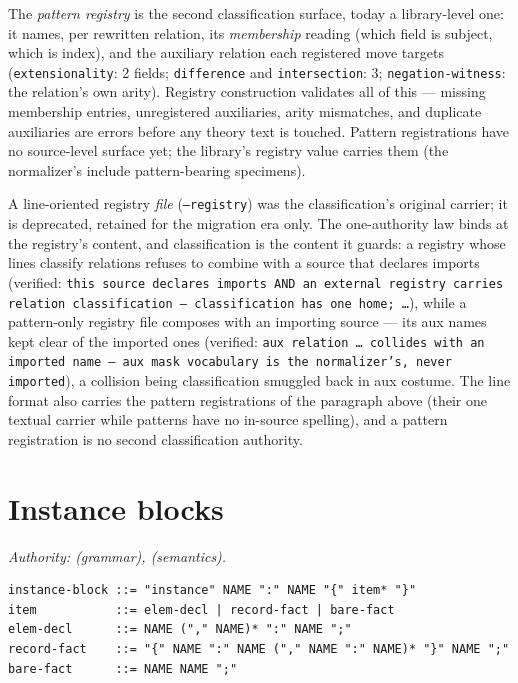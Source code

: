 The \emph{pattern registry} is the second classification surface,
today a library-level one: it names, per rewritten relation, its
\emph{membership} reading (which field is subject, which is index),
and the auxiliary relation each registered move targets
(\texttt{extensionality}: 2 fields; \texttt{difference} and
\texttt{intersection}: 3; \texttt{negation-witness}: the relation's
own arity). Registry construction validates all of this — missing
membership entries, unregistered auxiliaries, arity mismatches, and
duplicate auxiliaries are errors before any theory text is touched.
Pattern registrations have no source-level surface yet; the
library's registry value carries them (the normalizer's
 include pattern-bearing specimens).

A line-oriented registry \emph{file} (\texttt{--registry}) was the
classification's original carrier; it is deprecated, retained for
the migration era only. The one-authority law binds at the
registry's content, and classification is the content it guards: a
registry whose lines classify relations refuses to combine with a
source that declares imports (verified: \texttt{this source
declares imports AND an external registry carries relation
classification — classification has one home; …}), while a
pattern-only registry file composes with an importing source — its
aux names kept clear of the imported ones (verified: \texttt{aux
relation … collides with an imported name — aux mask vocabulary is
the normalizer's, never imported}), a collision being
classification smuggled back in aux costume. The
line format also carries the pattern registrations of the paragraph
above (their one textual carrier while patterns have no in-source
spelling), and a pattern registration is no second classification
authority.

\section{Instance blocks}
\label{sec:gr-instances}

\emph{Authority:  (grammar),
 (semantics).}

\begin{Verbatim}[fontsize=\small,frame=leftline,rulecolor=\color{accentmid},framesep=3mm,xleftmargin=3mm]
instance-block ::= "instance" NAME ":" NAME "{" item* "}"
item           ::= elem-decl | record-fact | bare-fact
elem-decl      ::= NAME ("," NAME)* ":" NAME ";"
record-fact    ::= "{" NAME ":" NAME ("," NAME ":" NAME)* "}" NAME ";"
bare-fact      ::= NAME NAME ";"
\end{Verbatim}

